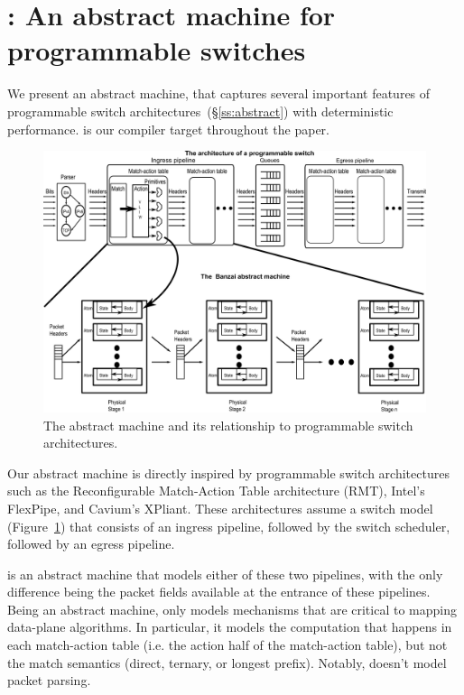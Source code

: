 \section{\absmachine: An abstract machine for programmable switches}

We present an abstract machine, \textit{\absmachine} that captures several
important features of programmable switch architectures~(\S\ref{ss:abstract})
with deterministic performance. \absmachine is our compiler target throughout
the paper.

\begin{figure}[!t]
  \includegraphics[width=\textwidth]{banzai.pdf}
  \caption{The \absmachine abstract machine and its relationship to programmable switch architectures.}
  \label{fig:switch}
\end{figure}
Our abstract machine is directly inspired by programmable switch architectures
such as the Reconfigurable Match-Action Table architecture (RMT), Intel's
FlexPipe, and Cavium's XPliant. These architectures assume a switch model
(Figure~\ref{fig:switch}) that consists of an ingress pipeline, followed by the
switch scheduler, followed by an egress pipeline.

\absmachine is an abstract machine that models either of these two pipelines,
with the only difference being the packet fields available at the entrance of
these pipelines. Being an abstract machine, \absmachine only models mechanisms
that are critical to mapping data-plane algorithms. In particular, it models
the computation that happens in each match-action table (i.e. the action half
of the match-action table), but not the match semantics (direct, ternary, or
longest prefix). Notably, \absmachine doesn't model packet parsing.

